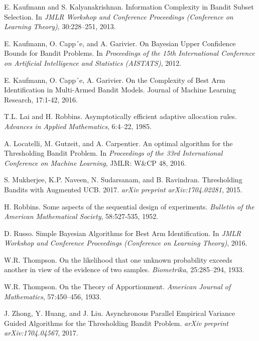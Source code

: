 \documentclass[11pt,]{article}
\begin{document}
E. Kaufmann and S. Kalyanakrishnan. Information Complexity in Bandit
Subset Selection. In \emph{JMLR Workshop and Conference Proceedings
(Conference on Learning Theory)}, 30:228--251, 2013.\par

E. Kaufmann, O. Capp´e, and A. Garivier. On Bayesian Upper Confidence
Bounds for Bandit Problems. In \emph{Proceedings of the 15th
International Conference on Artificial Intelligence and Statistics
(AISTATS)}, 2012.\par

E. Kaufmann, O. Capp´e, A. Garivier. On the Complexity of Best Arm
Identification in Multi-Armed Bandit Models. Journal of Machine Learning
Research, 17:1-42, 2016.\par

T.L. Lai and H. Robbins. Asymptotically efficient adaptive allocation
rules. \emph{Advances in Applied Mathematics}, 6:4--22, 1985.\par

A. Locatelli, M. Gutzeit, and A. Carpentier. An optimal algorithm for
the Thresholding Bandit Problem. In \emph{Proceedings of the 33rd
International Conference on Machine Learning}, JMLR: W\&CP 48, 2016.\par

S. Mukherjee, K.P. Naveen, N. Sudarsanam, and B. Ravindran. Thresholding
Bandits with Augmented UCB. 2017. \emph{arXiv preprint
arXiv:1704.02281}, 2015.\par

H. Robbins. Some aspects of the sequential design of experiments.
\emph{Bulletin of the American Mathematical Society}, 58:527-535,
1952.\par

D. Russo. Simple Bayesian Algorithms for Best Arm Identification. In
\emph{JMLR Workshop and Conference Proceedings (Conference on Learning
Theory)}, 2016.\par

W.R. Thompson. On the likelihood that one unknown probability exceeds
another in view of the evidence of two samples. \emph{Biometrika},
25:285--294, 1933.\par

W.R. Thompson. On the Theory of Apportionment. \emph{American Journal of
Mathematics}, 57:450--456, 1933.\par

J. Zhong, Y. Huang, and J. Liu. Asynchronous Parallel Empirical Variance
Guided Algorithms for the Thresholding Bandit Problem. \emph{arXiv
preprint arXiv:1704.04567}, 2017.\par
\end{document}
